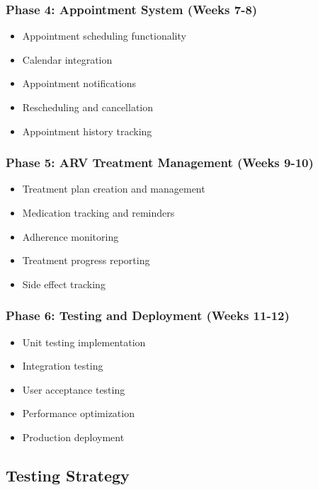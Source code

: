 \documentclass[12pt,a4paper]{article}
\begin{document}
\subsubsection{Phase 4: Appointment System (Weeks 7-8)}
\begin{itemize}
    \item Appointment scheduling functionality
    \item Calendar integration
    \item Appointment notifications
    \item Rescheduling and cancellation
    \item Appointment history tracking
\end{itemize}

\subsubsection{Phase 5: ARV Treatment Management (Weeks 9-10)}
\begin{itemize}
    \item Treatment plan creation and management
    \item Medication tracking and reminders
    \item Adherence monitoring
    \item Treatment progress reporting
    \item Side effect tracking
\end{itemize}

\subsubsection{Phase 6: Testing and Deployment (Weeks 11-12)}
\begin{itemize}
    \item Unit testing implementation
    \item Integration testing
    \item User acceptance testing
    \item Performance optimization
    \item Production deployment
\end{itemize}

\subsection{Testing Strategy}
\end{document}

